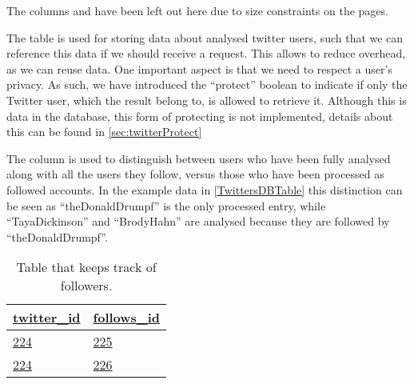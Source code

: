 The columns  and  have been left out here
due to size constraints on the pages.

\begin{table}[H]
\centering
{}
\caption{Table containing twitter users and their determined values.}
\label{TwittersDBTable}
\end{table}

The table  is used for storing data about analysed
twitter users, such that we can reference this data if we should receive
a request. This allows to reduce overhead, as we can reuse data. One
important aspect is that we need to respect a user's privacy. As such, we have
introduced the ``protect'' boolean to indicate if only the Twitter user, which the result
belong to, is allowed to retrieve it. Although this is data in the database,
this form of protecting is not implemented, details about this can be found in
\autoref{sec:twitterProtect}\nl

The  column is used to distinguish between users who have been
fully analysed along with all the users they follow, versus those who have been
processed as followed accounts. In the example data in \autoref{TwittersDBTable}
this distinction can be seen as ``theDonaldDrumpf'' is the only processed entry,
while ``TayaDickinson'' and ``BrodyHahn'' are analysed because they are followed
by ``theDonaldDrumpf''.

\begin{table}[H]
\centering
\begin{tabular}{| l | l |}
\hline
\textbf{\underline{twitter\_id}} & \textbf{\underline{follows\_id}} \\
\hline
\underline{224} & \underline{225} \\
\hline
\underline{224} & \underline{226} \\
\hline
\end{tabular}
\caption{Table that keeps track of followers.}
\label{TwitterTwitterDBTable}
\end{table}


